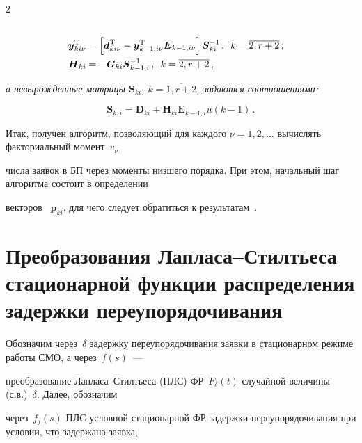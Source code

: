 \begin{multicols}{2}
\begin{align*}
\\

\boldsymbol{y}_{ki\nu}^{\mathrm{T}}&=\left[\boldsymbol{d}_{ki\nu}^{\mathrm{T}}-

\boldsymbol{y}_{k-1,i\nu}^{\mathrm{T}}\boldsymbol{E}_{k-1,i\nu}\right]

\boldsymbol{S}_{ki}^{-1}\,,\enskip k=\overline{2,r+2}\,;

\\

\boldsymbol{H}_{ki}&=-\boldsymbol{G}_{ki}\boldsymbol{S}_{k-1,i}^{-1}\,,\enskip k=\overline{2,r+2}\,,

\end{align*}

\textit{а невырожденные матрицы $\boldsymbol{S}_{ki}$, $k=\overline{1,r+2}$, задаются соотношениями:}

\begin{equation*}

\boldsymbol{S}_{k,i}=\boldsymbol{D}_{ki}+\boldsymbol{H}_{ki}

\boldsymbol{E}_{k-1,i}u(k-1)\,.

\end{equation*}





\smallskip



Итак, получен алгоритм, позволяющий для каж\-до\-го $\nu=1,2,\ldots$ вычислять факториальный момент~$v_{\nu}$ 

числа заявок в БП через моменты низшего порядка. При этом, начальный шаг алгоритма состоит в определении 

векторов~ $\boldsymbol{p}_{ki}$, для чего следует обратиться к результатам~\cite{2mat}.





\section{Преобразования Лапласа--Стилтьеса стационарной функции распределения задержки переупорядочивания}



Обозначим через~$\delta$ задержку переупорядочивания заявки в стационарном режиме работы СМО, а через~$f(s)$~--- 

преобразование Лапласа--Стилтьеса (ПЛС) ФР~$F_{\delta}(t)$ случайной величины (с.в.)~$\delta$. Далее, обозначим 

через~$f_j(s)$ ПЛС условной стационарной ФР задержки переупорядочивания при условии, что задержана заявка, 


\end{multicols}
